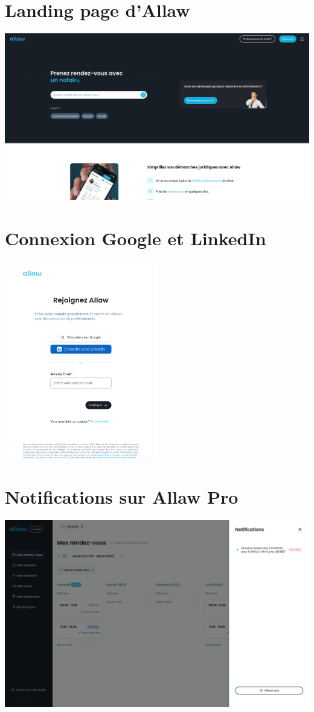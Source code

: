 
\section{Landing page d'Allaw}

\includegraphics[width=1.0\textwidth]{media/screenshot_allaw_landing_page.png}

\section{Connexion Google et LinkedIn}

\includegraphics[width=0.5\textwidth]{media/screenshot_allaw_signup.png}

\section{Notifications sur Allaw Pro}

\includegraphics[width=1.0\textwidth]{media/screenshot_notif.png}
